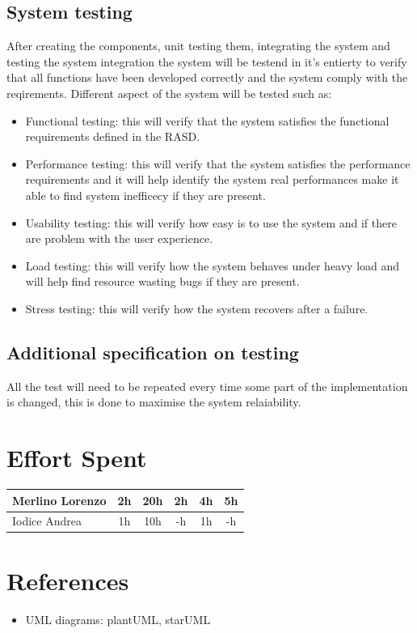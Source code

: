 \documentclass{article}
\begin{document}
\subsection{System testing}
After creating the components, unit testing them, integrating the system and testing the system integration the system will be testend in it's entierty to verify that all functions have been developed correctly and the system comply with the reqirements. Different aspect of the system will be tested such as:
\begin{itemize}
\item Functional testing: this will verify that the system satisfies the functional requirements defined in the RASD.
\item Performance testing: this will verify that the system satisfies the performance requirements and it will help identify the system real performances make it able to find system inefficecy if they are present.
\item Usability testing: this will verify how easy is to use the system and if there are problem with the user experience.
\item Load testing: this will verify how the system behaves under heavy load and will help find resource wasting bugs if they are present.
\item Stress testing: this will verify how the system recovers after a failure.
\end{itemize}

\subsection{Additional specification on testing}
All the test will need to be repeated every time some part of the implementation is changed, this is done to maximise the system relaiability.

\newpage
\section{Effort Spent}
\begin{center}
\begin{tabular}{||l|c|c|c|c|c||}
\hline
Merlino Lorenzo & 2h & 20h & 2h & 4h & 5h
\\
\hline
Iodice Andrea & 1h & 10h & -h & 1h & -h
\\
\hline
\end{tabular}
\end{center}

\newpage
\section{References}
\begin{itemize}
\item UML diagrams: plantUML, starUML
\end{itemize}
\end{document}
